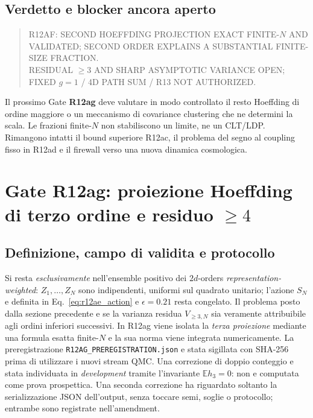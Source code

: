 \documentclass[11pt,a4paper]{article}
\newcommand{\status}[1]{\textsf{#1}}
\begin{document}
\subsection{Verdetto e blocker ancora aperto}

\begin{quote}\small
\status{R12AF: SECOND HOEFFDING PROJECTION EXACT FINITE-$N$ AND VALIDATED; SECOND ORDER EXPLAINS A SUBSTANTIAL FINITE-SIZE FRACTION.}\\
\status{RESIDUAL $\ge3$ AND SHARP ASYMPTOTIC VARIANCE OPEN; FIXED $g=1$ / 4D PATH SUM / R13 NOT AUTHORIZED.}
\end{quote}

Il prossimo Gate \textbf{R12ag} deve valutare in modo controllato il resto Hoeffding di ordine maggiore o un meccanismo di covariance clustering che ne determini la scala. Le frazioni finite-$N$ non stabiliscono un limite, ne un CLT/LDP. Rimangono intatti il bound superiore R12ac, il problema del segno al coupling fisso in R12ad e il firewall verso una nuova dinamica cosmologica.


\section{Gate R12ag: proiezione Hoeffding di terzo ordine e residuo $\geq4$}
\label{sec:r12ag}

\subsection{Definizione, campo di validita e protocollo}

Si resta \emph{esclusivamente} nell'ensemble positivo dei $2d$-orders \emph{representation-weighted}: $Z_1,\ldots,Z_N$ sono indipendenti, uniformi sul quadrato unitario; l'azione $S_N$ e definita in Eq.~\eqref{eq:r12ae_action} e $\epsilon=0.21$ resta congelato. Il problema posto dalla sezione precedente e se la varianza residua $V_{\ge3,N}$ sia veramente attribuibile agli ordini inferiori successivi. In R12ag viene isolata la \emph{terza proiezione} mediante una formula esatta finite-$N$ e la sua norma viene integrata numericamente. La preregistrazione \texttt{R12AG\_PREREGISTRATION.json} e stata sigillata con SHA-256 prima di utilizzare i nuovi stream QMC. Una correzione di doppio conteggio e stata individuata in \emph{development} tramite l'invariante $\mathbb E h_3=0$: non e computata come prova prospettica. Una seconda correzione ha riguardato soltanto la serializzazione JSON dell'output, senza toccare semi, soglie o protocollo; entrambe sono registrate nell'amendment.
\end{document}
